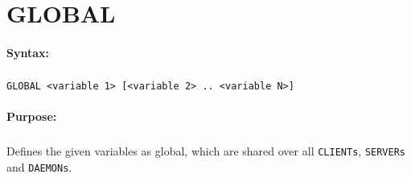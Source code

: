 
\newpage
\section{GLOBAL}
\label{cmd:GLOBAL}

\paragraph{Syntax:}
\subparagraph{}
\texttt{GLOBAL <variable 1> [<variable 2> .. <variable N>]}

\paragraph{Purpose:}
\subparagraph{}
Defines the given variables as global, which are shared over all
\texttt{CLIENTs}, \texttt{SERVERs} and \texttt{DAEMONs}.

